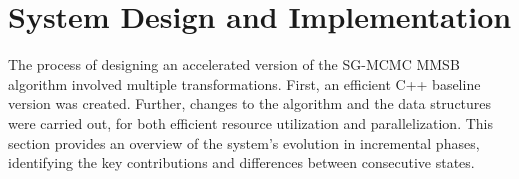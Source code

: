 \section{System Design and Implementation}

The process of designing an accelerated version of the SG-MCMC MMSB algorithm
involved multiple transformations. First, an efficient C++ baseline version
was created. Further, changes to the algorithm and the data structures
were carried out, for both efficient resource utilization and parallelization.
This section provides an overview of the system's evolution in incremental
phases, identifying the key contributions and differences between consecutive
states.





